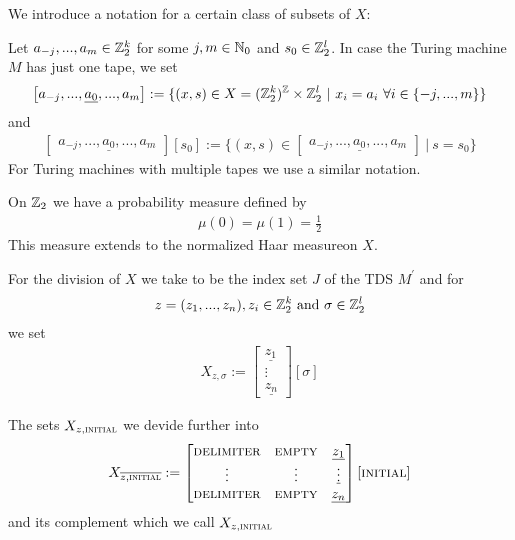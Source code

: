 \begin{Notation}
	We introduce a notation for a certain class of subsets of $X$:

	Let $a_{-j},...,a_{m} \in \mathbb{Z}_2^k$ for some $j, m \in \mathbb{N}_0$ and $s_0 \in \mathbb{Z}_2^l$. In case the Turing machine $M$ has just one tape, we set
	\begin{align*}
		\begin{bmatrix}
			a_{-j},...,\underline{a_0},...,a_m
		\end{bmatrix} := \{ (x,s) \in X = (\mathbb{Z}_2^k)^{\mathbb{Z}} \times \mathbb{Z}_2^l ~|~ x_i = a_i ~\forall i \in \{-j,...,m\}\} 
	\end{align*}
	and
	\begin{align*}
		\begin{bmatrix}
			a_{-j},...,\underline{a_0},...,a_m
		\end{bmatrix} [ s_0 ] := \{ (x,s) \in \begin{bmatrix} a_{-j},...,\underline{a_0},...,a_m \end{bmatrix} ~|~ s = s_0 \}
	\end{align*}
	For Turing machines with multiple tapes we use a similar notation.
\end{Notation}

On $\mathbb{Z}_2$ we have a probability measure defined by
\begin{align*}
	\mu(0) = \mu(1) = \frac12
\end{align*}
This measure extends to the normalized Haar measure\footnotemark on $X$.

For the division of $X$ we take  to be the index set $J$ of the TDS $M^\prime$ and for
\begin{align*}
	z = (z_1,...,z_n), z_i \in \mathbb{Z}_2^k ~\text{and}~\sigma \in \mathbb{Z}_2^l
\end{align*}
we set
\begin{align*}
	X_{z,\sigma} :=
	\begin{bmatrix}
		\underline{z_{1}} \\
		\vdots \\
		\underline{z_{n}}
	\end{bmatrix} [ \sigma ]
\end{align*}

The sets $X_{z,\text{\scshape{initial}}}$ we devide further into
\begin{align*}
	X_{\overline{z,\text{\scshape{initial}}}} :=
	\begin{bmatrix}
		\text{\scshape{delimiter}} & \text{\scshape{empty}} & \underline{z_1} \\
		\vdots & \vdots & \underline\vdots \\
		\text{\scshape{delimiter}} & \text{\scshape{empty}} & \underline{z_n} \\
	\end{bmatrix} [ \text{\scshape{initial}} ]
\end{align*}
and its complement which we call $X_{z,\text{\scshape{initial}}}$

